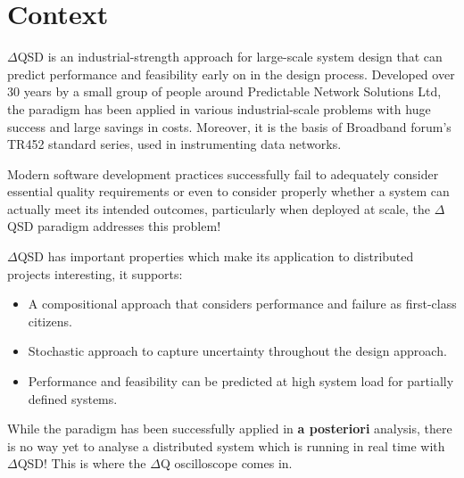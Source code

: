 \section{Context}
    $\Delta$QSD is an industrial-strength approach for large-scale system design that can predict performance and feasibility early on in the design process.  
    Developed over 30 years by a small group of people around Predictable Network Solutions Ltd, the paradigm has been applied in various industrial-scale problems with huge success and large savings in costs. \cite{dq-tut} Moreover, it is the basis of Broadband forum's TR452 standard series, used in instrumenting data networks. \cite{dq-br}

    Modern software development practices successfully fail to adequately consider essential quality requirements or even to consider properly whether a system can actually meet its intended outcomes, particularly when deployed at scale, the $\Delta$QSD paradigm addresses this problem! \cite{art}

       $\Delta$QSD has important properties which make its application to distributed projects interesting, it supports:
    \begin{itemize}
        \item A compositional approach that considers performance and failure as first-class citizens. 
        \item Stochastic approach to capture uncertainty throughout the design approach.
        \item Performance and feasibility can be predicted at high system load for partially defined systems.
    \end{itemize}
    
    While the paradigm has been successfully applied in \textbf{a posteriori} analysis, there is no way yet to analyse a distributed system which is running in real time with $\Delta$QSD! This is where the $\Delta$Q oscilloscope comes in. 
